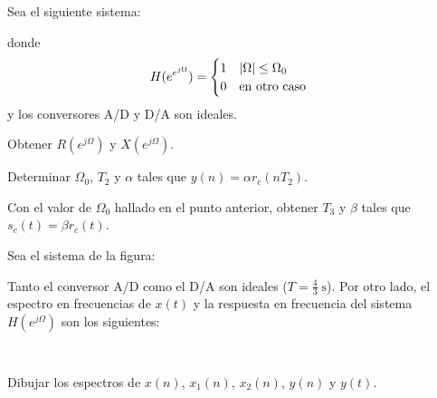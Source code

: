 \begin{ejercicio}
    Sea el siguiente sistema:
    \begin{center}
        
    \end{center}
    donde 
    \begin{align*}
        \parbox{0.5\textwidth}{
                
        } & H(e^{e^{j\Omega}}) = \begin{cases}
            1 & |\Omega| \leq \Omega_0 \\
            0 & \text{en otro caso}
            \end{cases}
    \end{align*}
    y los conversores A/D y D/A son ideales. 

    \inciso Obtener $R(e^{j\Omega})$ y $X(e^{j\Omega})$.

    \inciso Determinar $\Omega_0$, $T_2$ y $\alpha$ tales que $y(n) = \alpha r_c(nT_2)$.

    \inciso Con el valor de $\Omega_0$ hallado en el punto anterior, obtener $T_3$ y $\beta$ tales que $s_c(t) = \beta r_c(t)$.
\end{ejercicio}

\begin{ejercicio}
    Sea el sistema de la figura:
    \begin{center}
        
    \end{center}
    Tanto el conversor A/D como el D/A son ideales ($T = \frac{4}{3}\;\mathrm{s}$). Por otro lado, el espectro en frecuencias de $x(t)$ y la respuesta en frecuencia del sistema $H(e^{j\Omega})$ son los siguientes:
    \begin{align*}
        \parbox{0.5\textwidth}{
            \begin{center}
                
            \end{center}
        } & \hspace*{1em} & \parbox{0.5\textwidth}{
            \begin{center}
                
            \end{center}
        }
    \end{align*}        
    Dibujar los espectros de $x(n)$, $x_1(n)$, $x_2(n)$, $y(n)$ y $y(t)$.
\end{ejercicio}
